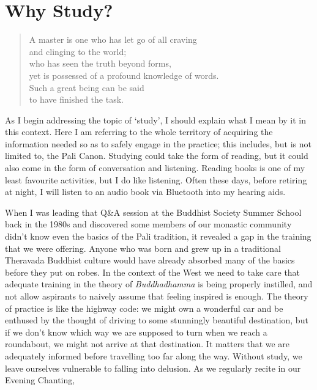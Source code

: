 \chapter{Why Study?}

\begin{quote}
  A master is one who has let go of all craving\\
  and clinging to the world;\\
  who has seen the truth beyond forms,\\
  yet is possessed of a profound knowledge of words.\\
  Such a great being can be said\\
  to have finished the task.

\end{quote}

As I begin addressing the topic of `study', I should explain what
I mean by it in this context. Here I am referring to the whole territory
of acquiring the information needed so as to safely engage in the
practice; this includes, but is not limited to, the Pali Canon. Studying
could take the form of reading, but it could also come in the form of
conversation and listening. Reading books is one of my least favourite
activities, but I do like listening. Often these days, before retiring
at night, I will listen to an audio book via Bluetooth into my hearing
aids.

When I was leading that Q\&A session at the Buddhist Society Summer
School back in the 1980s and discovered some members of our monastic
community didn't know even the basics of the Pali tradition, it revealed
a gap in the training that we were offering. Anyone who was born and
grew up in a traditional Theravada Buddhist culture would have already
absorbed many of the basics before they put on robes. In the context of
the West we need to take care that adequate training in the theory of
\emph{Buddhadhamma} is being properly instilled, and not allow aspirants
to naively assume that feeling inspired is enough. The theory of
practice is like the highway code: we might own a wonderful car and be
enthused by the thought of driving to some stunningly beautiful
destination, but if we don't know which way we are supposed to turn when
we reach a roundabout, we might not arrive at that destination. It
matters that we are adequately informed before travelling too far along
the way. Without study, we leave ourselves vulnerable to falling into
delusion. As we regularly recite in our Evening Chanting,

